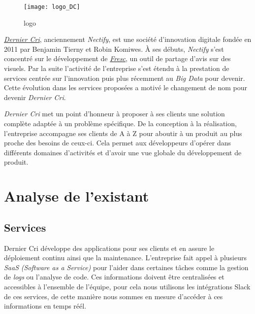\documentclass[12pt,a4paper]{article}
\begin{document}
  \bigskip

  \begin{figure}[htbp]
  \centering
  \texttt{[image: logo\_DC]}
  \caption{logo}
  \end{figure}

  \bigskip

  \emph{\href{http://derniercri.io}{Dernier Cri}}, anciennement
  \emph{Nectify}, est une société d'innovation digitale fondée en 2011 par
  Benjamin Tierny et Robin Komiwes. À ses débuts, \emph{Nectify} s'est
  concentré sur le développement de \emph{\href{http://fre.sc}{Fresc}}, un
  outil de partage d'avis sur des visuels. Par la suite l'activité de
  l'entreprise s'est étendu à la prestation de services centrée sur
  l'innovation puis plus récemment au \emph{Big Data} pour devenir. Cette
  évolution dans les services proposées a motivé le changement de nom pour
  devenir \emph{Dernier Cri}.

  \bigskip

  \emph{Dernier Cri} met un point d'honneur à proposer à ses clients une
  solution complète adaptée à un problème spécifique. De la conception à
  la réalisation, l'entreprise accompagne ses clients de A à Z pour
  aboutir à un produit au plus proche des besoins de ceux-ci. Cela permet
  aux développeurs d'opérer dans différents domaines d'activités et
  d'avoir une vue globale du développement de produit.

  \newpage

  \section{Analyse de l'existant}\label{analyse-de-lexistant}

  \bigskip

  \subsection{Services}\label{services}

  \bigskip

  Dernier Cri développe des applications pour ses clients et en assure le
  déploiement continu ainsi que la maintenance. L'entreprise fait appel à
  plusieurs \emph{SaaS} \emph{(Software as a Service)} pour l'aider dans
  certaines tâches comme la gestion de \emph{logs} ou l'analyse de code.
  Ces informations doivent être centralisées et accessibles à l'ensemble
  de l'équipe, pour cela nous utilisons les intégrations Slack de ces
  services, de cette manière nous sommes en mesure d'accéder à ces
  informations en temps réél.
\end{document}
